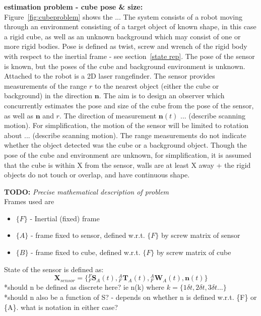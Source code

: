 \textbf{estimation problem - cube pose \& size:}\\
Figure~\ref{fig:cubeproblem} shows the ...
The system consists of a robot moving through an environment consisting of a target object of known shape, in this case a rigid cube, as well as an unknown background which may consist of one or more rigid bodies. Pose is defined as twist, screw and wrench of the rigid body with respect to the inertial frame - see section~\ref{state rep}. The pose of the sensor is known, but the poses of the cube and background environment is unknown. Attached to the robot is a 2D laser rangefinder. The sensor provides measurements of the range $r$ to the nearest object (either the cube or background) in the direction $\mathbf{n}$. The aim is to design an observer which concurrently estimates the pose and size of the cube from the pose of the sensor, as well as $\mathbf{n}$ and $r$. 
The direction of measurement $\mathbf{n}(t)$ ... (describe scanning motion). For simplification, the motion of the sensor will be limited to rotation about ... (describe scanning motion).
The range measurements do not indicate whether the object detected was the cube or a background object. Though the pose of the cube and environment are unknown, for simplification, it is assumed that the cube is within X from the sensor, walls are at least X away + the rigid objects do not touch or overlap, and have continuous shape.


\textbf{TODO:} \textit{Precise mathematical description of problem}\\
Frames used are
\begin{itemize}
\item $\{F\}$ - Inertial (fixed) frame
\item $\{A\}$ - frame fixed to sensor, defined w.r.t. $\{F\}$ by screw matrix of sensor
\item $\{B\}$ - frame fixed to cube, defined w.r.t. $\{F\}$ by screw matrix of cube
\end{itemize} 

State of the sensor is defined as:
\begin{equation}
	\mathbf{X}_{sensor} = 
	\{{^{F}_{F}\mathbf{S}^{}_{A}(t)},{^{A}_{F}\mathbf{T}^{}_{A}(t)},{^{A}_{F}\mathbf{W}^{}_{A}(t)},
	\mathbf{n}(t)\}
\end{equation}
*should n be defined as discrete here? ie n(k) where $k = \{1\delta t,2\delta t,3\delta t...\}$\\
*should n also be a function of S? - depends on whether n is defined w.r.t. \{F\} or \{A\}. what is notation in either case?


